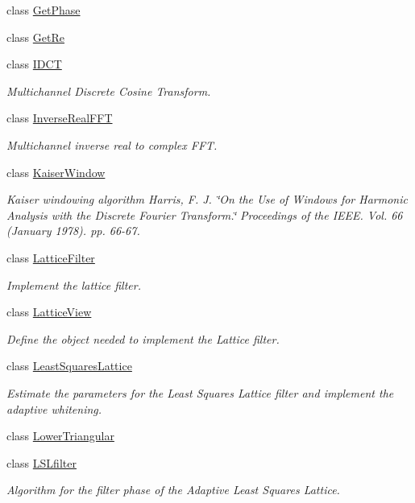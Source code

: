 \begin{DoxyCompactItemize}
class \hyperlink{classtsa_1_1_get_phase}{Get\+Phase}
\item 
class \hyperlink{classtsa_1_1_get_re}{Get\+Re}
\item 
class \hyperlink{classtsa_1_1_i_d_c_t}{I\+D\+CT}
\begin{DoxyCompactList}\small\item\em Multichannel Discrete Cosine Transform. \end{DoxyCompactList}\item 
class \hyperlink{classtsa_1_1_inverse_real_f_f_t}{Inverse\+Real\+F\+FT}
\begin{DoxyCompactList}\small\item\em Multichannel inverse real to complex F\+FT. \end{DoxyCompactList}\item 
class \hyperlink{classtsa_1_1_kaiser_window}{Kaiser\+Window}
\begin{DoxyCompactList}\small\item\em Kaiser windowing algorithm Harris, F. J. \char`\"{}\+On the Use of Windows for Harmonic Analysis with the Discrete Fourier Transform.\char`\"{} Proceedings of the I\+E\+EE. Vol. 66 (January 1978). pp. 66-\/67. \end{DoxyCompactList}\item 
class \hyperlink{classtsa_1_1_lattice_filter}{Lattice\+Filter}
\begin{DoxyCompactList}\small\item\em Implement the lattice filter. \end{DoxyCompactList}\item 
class \hyperlink{classtsa_1_1_lattice_view}{Lattice\+View}
\begin{DoxyCompactList}\small\item\em Define the object needed to implement the Lattice filter. \end{DoxyCompactList}\item 
class \hyperlink{classtsa_1_1_least_squares_lattice}{Least\+Squares\+Lattice}
\begin{DoxyCompactList}\small\item\em Estimate the parameters for the Least Squares Lattice filter and implement the adaptive whitening. \end{DoxyCompactList}\item 
class \hyperlink{classtsa_1_1_lower_triangular}{Lower\+Triangular}
\item 
class \hyperlink{classtsa_1_1_l_s_lfilter}{L\+S\+Lfilter}
\begin{DoxyCompactList}\small\item\em Algorithm for the filter phase of the Adaptive Least Squares Lattice. \end{DoxyCompactList}\item 

\end{DoxyCompactItemize}
